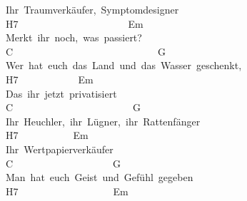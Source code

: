 \documentclass[]{book}
\begin{document}
Ihr~Traumverkäufer,~Symptomdesigner\\
\hspace*{0.333em}H7~~~~~~~~~~~~~~~~~~~~~~Em~\\
Merkt~ihr~noch,~was~passiert?~\\
\hspace*{0.333em}C~~~~~~~~~~~~~~~~~~~~~~~~~~~~~G\\
Wer~hat~euch~das~Land~und~das~Wasser~geschenkt,~\\
\hspace*{0.333em}\hspace*{0.333em}\hspace*{0.333em}\hspace*{0.333em}\hspace*{0.333em}\hspace*{0.333em}\hspace*{0.333em}\hspace*{0.333em}\hspace*{0.333em}H7~~~~~~~~~~~~Em\\
Das~ihr~jetzt~privatisiert\\
\hspace*{0.333em}\hspace*{0.333em}\hspace*{0.333em}\hspace*{0.333em}\hspace*{0.333em}\hspace*{0.333em}C~~~~~~~~~~~~~~~~~~~~~~~~G\\
Ihr~Heuchler,~ihr~Lügner,~ihr~Rattenfänger~\\
\hspace*{0.333em}\hspace*{0.333em}\hspace*{0.333em}\hspace*{0.333em}\hspace*{0.333em}H7~~~~~~~~~~~Em\\
Ihr~Wertpapierverkäufer\\
\hspace*{0.333em}\hspace*{0.333em}\hspace*{0.333em}\hspace*{0.333em}\hspace*{0.333em}C~~~~~~~~~~~~~~~~~~~~G\\
Man~hat~euch~Geist~und~Gefühl~gegeben~\\
\hspace*{0.333em}\hspace*{0.333em}\hspace*{0.333em}\hspace*{0.333em}\hspace*{0.333em}H7~~~~~~~~~~~~~~~~~~~Em\\
\end{document}
